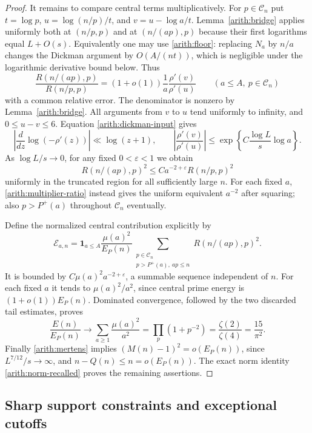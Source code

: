 \begin{proof}
It remains to compare central terms multiplicatively. For $p\in\mathcal C_n$
put $t=\log p$, $u=\log(n/p)/t$, and $v=u-\log a/t$.
Lemma~\ref{arith:bridge} applies uniformly both at $(n/p,p)$ and at
$(n/(ap),p)$ because their first logarithms equal $L+O(s)$.
Equivalently one may use \eqref{arith:floor}: replacing $N_a$ by $n/a$
changes the Dickman argument by $O(A/(nt))$, which is negligible under
the logarithmic derivative bound below. Thus
\begin{equation}\label{arith:multiplier-ratio}
 \frac{R(n/(ap),p)}{R(n/p,p)}
 =(1+o(1))\frac1a\frac{\rho'(v)}{\rho'(u)}
 \qquad(a\le A,\ p\in\mathcal C_n)
\end{equation}
with a common relative error. The denominator is nonzero by
Lemma~\ref{arith:bridge}. All arguments from $v$ to $u$ tend uniformly
to infinity, and $0\le u-v\le6$.
Equation \eqref{arith:dickman-input} gives
\[
 \left|\frac{d}{dz}\log(-\rho'(z))\right|
 \ll\log(z+1),\qquad
 \left|\frac{\rho'(v)}{\rho'(u)}\right|
 \le\exp\left\{C\frac{\log L}{s}\log a\right\}.
\]
As $\log L/s\to0$, for any fixed $0<\varepsilon<1$ we obtain
\begin{equation}\label{arith:domination}
 R(n/(ap),p)^2\le C a^{-2+\varepsilon}R(n/p,p)^2
\end{equation}
uniformly in the truncated region for all sufficiently large $n$.
For each fixed $a$, \eqref{arith:multiplier-ratio} instead gives the
uniform equivalent $a^{-2}$ after squaring; also $p>P^+(a)$ throughout
$\mathcal C_n$ eventually.

Define the normalized central contribution explicitly by
\[
 \mathcal E_{a,n}=\mathbf1_{a\le A}\frac{\mu(a)^2}{E_P(n)}
 \sum_{\substack{p\in\mathcal C_n\\p>P^+(a),\ ap\le n}}
 R(n/(ap),p)^2.
\]
It is bounded by
$C\mu(a)^2a^{-2+\varepsilon}$, a summable sequence independent of $n$.
For each fixed $a$ it tends to $\mu(a)^2/a^2$, since central prime energy
is $(1+o(1))E_P(n)$. Dominated convergence, followed by the two discarded
tail estimates, proves
\[
 \frac{E(n)}{E_P(n)}\longrightarrow
 \sum_{a\ge1}\frac{\mu(a)^2}{a^2}
 =\prod_p(1+p^{-2})=\frac{\zeta(2)}{\zeta(4)}=\frac{15}{\pi^2}.
\]
Finally \eqref{arith:mertens} implies
$(M(n)-1)^2=o(E_P(n))$, since $L^{7/12}/s\to\infty$,
and $n-Q(n)\le n=o(E_P(n))$. The exact norm identity
\eqref{arith:norm-recalled} proves the remaining assertions.
\end{proof}

\subsection{Sharp support constraints and exceptional cutoffs}

